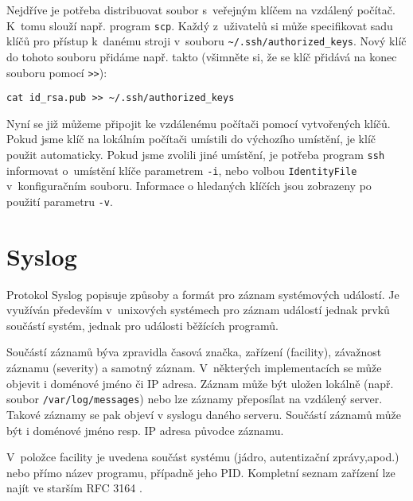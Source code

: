 Nejdříve je potřeba distribuovat soubor s~veřejným klíčem na vzdálený počítač. K~tomu slouží
 např. program {\tt scp}. Každý z~uživatelů si může specifikovat sadu klíčů pro přístup k~danému
 stroji v~souboru \verb|~/.ssh/authorized_keys|. Nový klíč do tohoto souboru přidáme např. takto
 (všimněte si, že se klíč přidává na konec souboru pomocí \verb|>>|):

\begin{verbatim}
cat id_rsa.pub >> ~/.ssh/authorized_keys
\end{verbatim}

Nyní se již můžeme připojit ke vzdálenému počítači pomocí vytvořených klíčů. Pokud jsme klíč
 na lokálním počítači umístili do výchozího umístění, je klíč použit automaticky. Pokud jsme
 zvolili jiné umístění, je potřeba program {\tt ssh} informovat o~umístění klíče parametrem
 {\tt -i}, nebo volbou {\tt IdentityFile} v~konfiguračním souboru. Informace o hledaných
 klíčích jsou zobrazeny po použití parametru {\tt -v}.

\section{Syslog}
Protokol Syslog \cite{rfc5424} popisuje způsoby a formát pro záznam systémových událostí. Je využíván
 především v~unixových systémech pro záznam událostí jednak prvků součástí systém, jednak pro
 události běžících programů. 

Součástí záznamů býva zpravidla časová značka, zařízení (facility), závažnost záznamu (severity)
 a samotný záznam. V~některých implementacích se může objevit i doménové jméno či IP adresa. Záznam
 může být uložen lokálně (např. soubor \verb|/var/log/messages|) nebo lze záznamy přeposílat
 na vzdálený server. Takové záznamy se pak objeví v syslogu daného serveru. Součástí záznamů může být
 i doménové jméno resp. IP adresa původce záznamu.

V~položce facility je uvedena součást systému (jádro, autentizační zprávy,apod.) nebo
 přímo název programu, případně jeho PID. Kompletní seznam zařízení lze najít ve starším RFC 3164
 \cite{rfc3164}.

